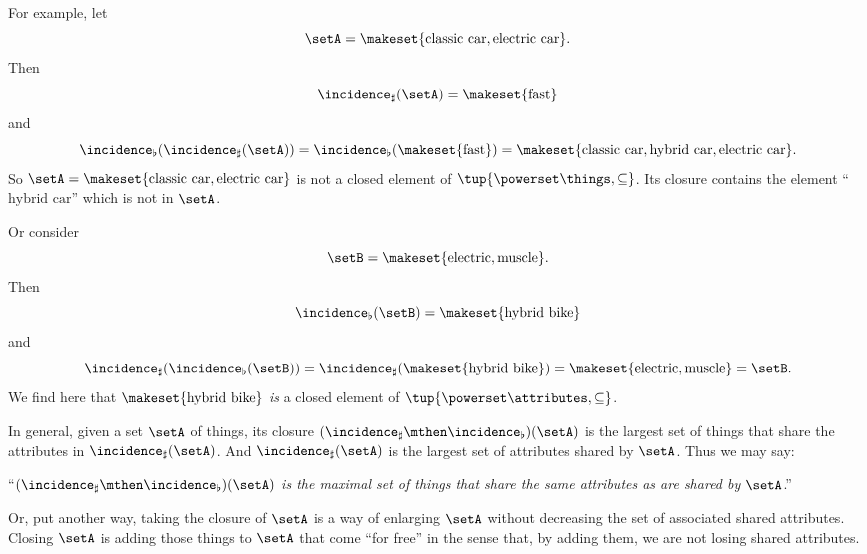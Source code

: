 For example, let 
\begin{equation}\label{eq:cfa-closure-example-1}
\setA = \makeset{\text{classic car}, \text{electric car}}.
\end{equation}
Then 
\begin{equation}\label{eq:cfa-closure-example-2}
\incidence_\sharp(\setA) = \makeset{\text{fast}}
\end{equation}
and 
\begin{equation}\label{eq:cfa-closure-example-3}
\incidence_\flat(\incidence_\sharp(\setA)) = \incidence_\flat(\makeset{\text{fast}}) = \makeset{\text{classic car}, \text{hybrid car}, \text{electric car}}.
\end{equation}
So $\setA = \makeset{\text{classic car}, \text{electric car}}$ is not a closed element of $\tup{\powerset \things, \subseteq}$. Its closure contains the element ``$\text{hybrid car}$'' which is not in $\setA$.

Or consider 
\begin{equation}\label{eq:cfa-closure-example-4}
\setB = \makeset{\text{electric}, \text{muscle}}.
\end{equation}
Then
\begin{equation}\label{eq:cfa-closure-example-5}
\incidence_\flat(\setB) = \makeset{\text{hybrid bike}}
\end{equation}
and 
\begin{equation}\label{eq:cfa-closure-example-6}
\incidence_\sharp(\incidence_\flat(\setB)) = \incidence_\sharp(\makeset{\text{hybrid bike}}) = \makeset{\text{electric}, \text{muscle}} = \setB.
\end{equation}
We find here that $\makeset{\text{hybrid bike}}$ \emph{is} a closed element of $\tup{\powerset \attributes, \subseteq}$. 

In general, given a set $\setA$ of things, its closure $(\incidence_\sharp \mthen \incidence_\flat)(\setA)$ is the largest set of things that share the attributes in $\incidence_\sharp(\setA)$. And $\incidence_\sharp(\setA)$ is the largest set of attributes shared by $\setA$. Thus we may say:

 ``\emph{$(\incidence_\sharp \mthen \incidence_\flat)(\setA)$ is the maximal set of things that share the same attributes as are shared by $\setA$}.'' 
 
Or, put another way, taking the closure of $\setA$ is a way of enlarging $\setA$ without decreasing the set of associated shared attributes. Closing $\setA$ is adding those things to $\setA$ that come ``for free'' in the sense that, by adding them, we are not losing shared attributes. 

